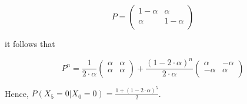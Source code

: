 \documentclass[10pt,a4paper]{article}
\begin{document}
\begin{flushleft}
\[ P = \left ( \begin{array}{cc}
 1-\alpha & \alpha \\
\alpha & 1-\alpha   \\
\end{array} \right) \]

it follows that

\[ P^n = \frac{1}{2 \cdot \alpha} \left ( \begin{array}{cc}
 \alpha & \alpha \\
\alpha & \alpha   \\
\end{array} \right)  + \frac{(1-2 \cdot \alpha)^n }{2 \cdot \alpha}
\left ( \begin{array}{cc}
 \alpha & -\alpha \\
-\alpha & \alpha   \\
\end{array} \right)\]


Hence, $P(X_5=0|X_0=0)=\frac{1+(1-2 \cdot \alpha)^5}{2}$.


\end{flushleft}
\end{document}
